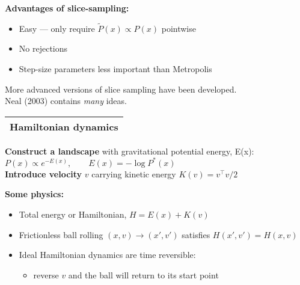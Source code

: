 \documentclass[25pt,landscape]{foils}
\newcommand{\Gray}{\textcolor{mygray}}
\newcommand{\Green}{\textcolor{mypine}}
\newcommand{\myfoilhead}[1]{
\newpage
\vspace*{-1cm}
\Gray{
\begin{tabular*}{\textwidth}{l}
{\bf \Huge #1} \\
\bottomrule
\end{tabular*}}}
\newcommand{\N}{\mathcal{N}}
\newcommand{\ra}{\!\rightarrow\!}
\begin{document}
\Green{\bf Advantages of slice-sampling:}
\begin{itemize}
    \setlength{\itemsep}{5pt}
    \setlength{\parskip}{5pt}
    \setlength{\parsep}{0cm}
\item Easy --- only require $\tilde{P}(x)\propto P(x)$ pointwise
    \item No rejections
    \item Step-size parameters less important than Metropolis
\end{itemize}

\vfill
\vfill
More advanced versions of slice sampling have been developed.\\
Neal (2003) contains \emph{many} ideas.

\myfoilhead{Hamiltonian dynamics}

\vfill

\Green{\bf Construct a landscape} with gravitational potential energy, E(x):\\[0.2in]
\hspace*{2cm} $P(x)\propto e^{-E(x)}, \qquad E(x)=-\log P^*(x)$\\


\Green{\bf Introduce velocity} $v$ carrying kinetic energy $K(v)=v^\top v/2$\\

\vfill

\Green{\bf Some physics:}
\begin{itemize}
    \item Total energy or Hamiltonian, $H=E(x)+K(v)$ 
    \item Frictionless ball rolling $(x,v)\ra (x',v')$ satisfies $H(x',v')=H(x,v)$
    \item Ideal Hamiltonian dynamics are time reversible:
    \begin{itemize}
        \item reverse $v$ and the ball will return to its start point
    \end{itemize}
\end{itemize}
\end{document}
